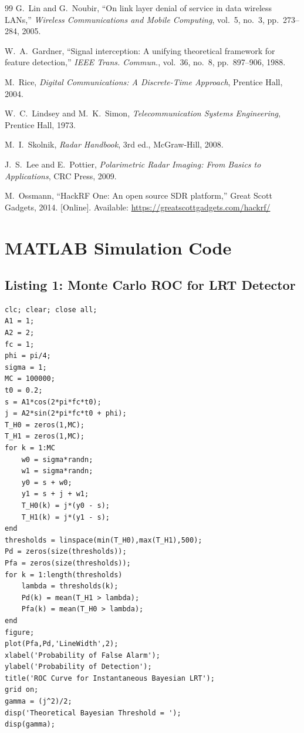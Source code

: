 \documentclass{article}
\begin{document}
\begin{thebibliography}{99}
G.~Lin and G.~Noubir, ``On link layer denial of service in data wireless LANs,'' \textit{Wireless Communications and Mobile Computing}, vol.~5, no.~3, pp.~273--284, 2005.

W.~A.~Gardner, ``Signal interception: A unifying theoretical framework for feature detection,'' \textit{IEEE Trans. Commun.}, vol.~36, no.~8, pp.~897--906, 1988.

M.~Rice, \textit{Digital Communications: A Discrete-Time Approach}, Prentice Hall, 2004.

W.~C.~Lindsey and M.~K.~Simon, \textit{Telecommunication Systems Engineering}, Prentice Hall, 1973.

M.~I.~Skolnik, \textit{Radar Handbook}, 3rd ed., McGraw-Hill, 2008.

J.~S.~Lee and E.~Pottier, \textit{Polarimetric Radar Imaging: From Basics to Applications}, CRC Press, 2009.

M.~Ossmann, ``HackRF One: An open source SDR platform,'' Great Scott Gadgets, 2014. [Online]. Available: \url{https://greatscottgadgets.com/hackrf/}

\end{thebibliography}


\newpage
\appendix
\section{MATLAB Simulation Code}\label{app:matlab}

\subsection{Listing 1: Monte Carlo ROC for LRT Detector}\label{lst:roc}
\begin{verbatim}
clc; clear; close all;
A1 = 1;
A2 = 2;
fc = 1;
phi = pi/4;
sigma = 1;
MC = 100000;
t0 = 0.2;
s = A1*cos(2*pi*fc*t0);
j = A2*sin(2*pi*fc*t0 + phi);
T_H0 = zeros(1,MC);
T_H1 = zeros(1,MC);
for k = 1:MC
    w0 = sigma*randn;
    w1 = sigma*randn;
    y0 = s + w0;
    y1 = s + j + w1;
    T_H0(k) = j*(y0 - s);
    T_H1(k) = j*(y1 - s);
end
thresholds = linspace(min(T_H0),max(T_H1),500);
Pd = zeros(size(thresholds));
Pfa = zeros(size(thresholds));
for k = 1:length(thresholds)
    lambda = thresholds(k);
    Pd(k) = mean(T_H1 > lambda);
    Pfa(k) = mean(T_H0 > lambda);
end
figure;
plot(Pfa,Pd,'LineWidth',2);
xlabel('Probability of False Alarm');
ylabel('Probability of Detection');
title('ROC Curve for Instantaneous Bayesian LRT');
grid on;
gamma = (j^2)/2;
disp('Theoretical Bayesian Threshold = ');
disp(gamma);
\end{verbatim}
\end{document}
